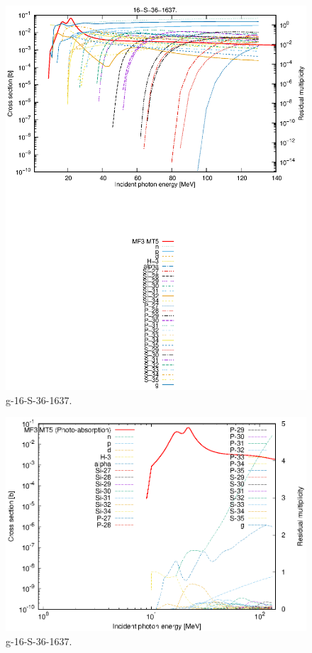\begin{figure}
 \includegraphics[width=\linewidth]{eps/g_16-S-36_1637.eps}
  \caption{g-16-S-36-1637.}
\end{figure}
\newpage \clearpage

\begin{figure}
 \includegraphics[width=\linewidth]{eps-log/g_16-S-36_1637.eps}
 \caption{g-16-S-36-1637.}
\end{figure}
\newpage \clearpage

